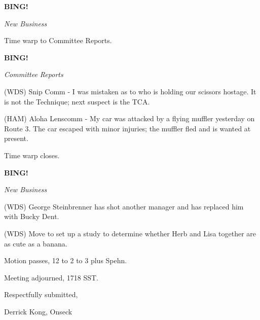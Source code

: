 \documentclass[12pt]{article}
\newcommand{\bing}{{\bf BING!} }
\newcommand{\goto}[1]{\bing \vskip 12pt \centerline{{\em{#1}}}}
\begin{document}
\goto{New Business}

Time warp to Committee Reports.

\goto{Committee Reports}

(WDS) Snip Comm - I was mistaken as to who is holding our scissors hostage. It is not the Technique; next suspect is the TCA.

(HAM) Aloha Lenscomm - My car was attacked by a flying muffler yesterday on Route 3. The car escaped with minor injuries; the muffler fled and is wanted at present.

Time warp closes.

\goto{New Business}

(WDS) George Steinbrenner has shot another manager and has replaced him with Bucky Dent.

(WDS) Move to set up a study to determine whether Herb and Lisa together are as cute as a banana.

Motion passes, 12 to 2 to 3 plus Spehn.

\vspace{12pt}

\noindent
Meeting adjourned, 1718 SST.

\vspace{18pt}

\centerline{Respectfully submitted,}
\centerline{Derrick Kong, Onseck}
\end{document}
